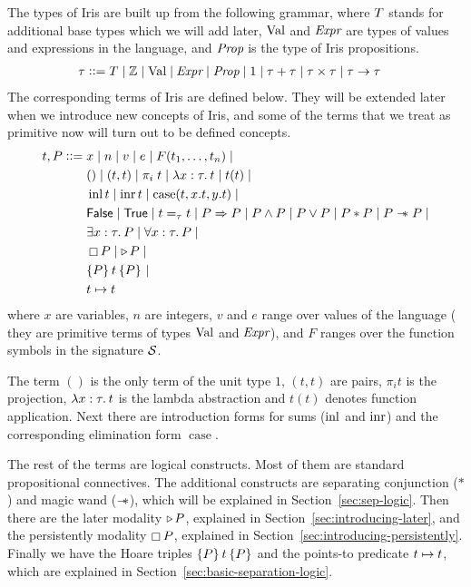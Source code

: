 The types of Iris are built up from the following grammar, where $T$ stands for additional base types which we will add later, $\text{Val}$ and $\kern-0.05em\textit{Expr}$ are types of values and expressions in the language, and $\textit{Prop}$ is the type of Iris propositions.
\begin{align*}
  \tau \vcentcolon\vcentcolon={}
  &
    T \mid
    \mathbb{Z} \mid
    \text{Val} \mid
    \kern-0.05em\textit{Expr} \mid
    \textit{Prop} \mid
    1 \mid
    \tau + \tau \mid
    \tau \times \tau \mid
    \tau \to \tau
\end{align*}%
%
The corresponding terms of Iris are defined below.
They will be extended later when we introduce new concepts of Iris,
and some of the terms that we treat as primitive now will turn out to be defined concepts.
\begin{align*}
  \term, \prop \bnfdef{}
  &
    \var \mid n \mid v \mid e \mid \sigfn(\term_1, \dots, \term_n) \mid
  \\&    
    () \mid
    (\term, \term) \mid
    \pi_i\; \term \mid
    \Lam \var:\type.\term \mid
      \term(\term)  \mid
  \\&
      \inl\term \mid
      \inr\term \mid
      \case{\term}{x}{\term}{y}{\term}\mid
  \\&
    \FALSE \mid
    \TRUE \mid
    \term =_\type \term \mid
    \prop \Ra \prop \mid
    \prop \land \prop \mid
    \prop \lor \prop \mid
    \prop \ast\prop \mid
    \prop \wand \prop \mid
  \\&
    \Exists \var:\type. \prop \mid
    \All \var:\type. \prop \mid
  \\&
    \persistently\prop \mid
    {\later\prop} \mid
  \\&
    \hoare{\prop}{\term}{\prop} \mid
  \\& 
    t \pointsto t
\end{align*}
where $x$ are variables, $n$ are integers, $v$ and $e$ range over values of the language (\ie{} they are primitive terms of types $\text{Val}$ and $\kern-0.05em\textit{Expr}$), and $F$ ranges over the function symbols in the signature $\mathcal{S}$.

The term $()$ is the only term of the unit type $1$, $(t,t)$ are pairs, $\pi_i t$ is the projection, $\Lam \var : \type.\term$ is the lambda abstraction and $t(t)$ denotes function application.
Next there are introduction forms for sums ($\operatorname{inl}$ and $\operatorname{inr}$) and the corresponding elimination form $\operatorname{case}$.

The rest of the terms are logical constructs.
Most of them are standard propositional connectives.
The additional constructs are separating conjunction ($\ast$) and magic wand ($\mathrel{-\!\!\ast}$), which will be explained in Section~\ref{sec:sep-logic}.
Then there are the later modality $\mathop{{\triangleright}} P$, explained in Section~\ref{sec:introducing-later}, and the persistently modality $\mathop{\boxempty} P$, explained in Section~\ref{sec:introducing-persistently}.
Finally we have the Hoare triples $\hoare{P}{t}{P}$ and the points-to predicate $t \mapsto t$, which are explained in Section~\ref{sec:basic-separation-logic}.

